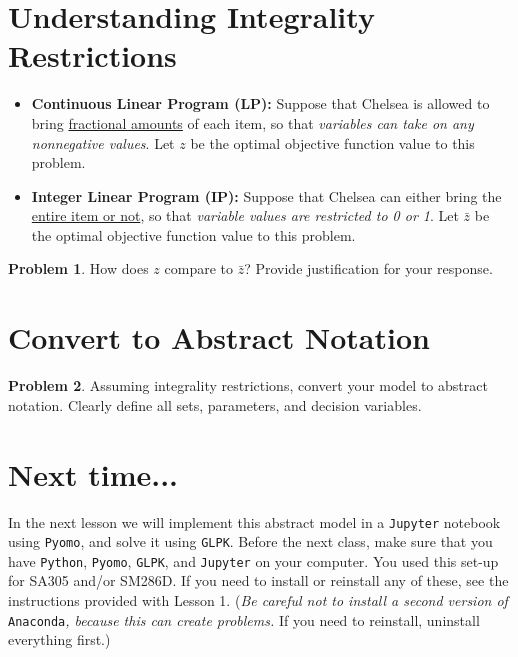 \documentclass[12pt]{article}
\theoremstyle{definition}
\newtheorem{problem}{Problem}
\begin{document}
\vfill

\section{Understanding Integrality Restrictions}
\begin{itemize}
\item \textbf{Continuous Linear Program (LP):}  Suppose that Chelsea is allowed to bring \underline{fractional amounts} of each item, so that \emph{variables can take on any nonnegative values}. Let $z$ be the optimal objective function value to this problem.

\item \textbf{Integer Linear Program (IP):} Suppose that Chelsea can either bring the \underline{entire item or not}, so that \emph{variable values are restricted to  0 or 1}. Let $\bar{z}$ be the optimal objective function value to this problem.
\end{itemize}
\begin{problem} How does $z$ compare to $\bar{z}$? Provide justification for your response. \end{problem}

\vfill

\pagebreak
\section{Convert to Abstract Notation}
\begin{problem}
Assuming integrality restrictions, convert your model to abstract notation.  Clearly define all sets, parameters, and decision variables. \\
\end{problem}

\vskip 15cm
\section{Next time...}
In the next lesson we will implement this abstract model in a \texttt{Jupyter} notebook using \texttt{Pyomo}, and solve it using \texttt{GLPK}.  Before the next class, make sure that you have \texttt{Python}, \texttt{Pyomo}, \texttt{GLPK}, and \texttt{Jupyter} on your computer.  You used this set-up for SA305 and/or SM286D.  If you need to install or reinstall any of these, see the instructions provided with Lesson 1.  (\emph{Be careful not to install a second version of} \texttt{Anaconda}\emph{, because this can create problems.}  If you need to reinstall, uninstall everything first.)
\end{document}
